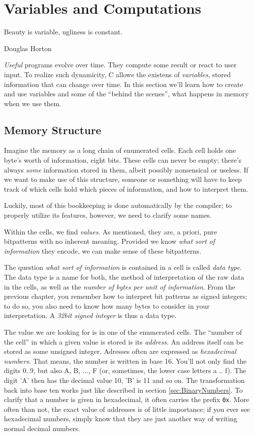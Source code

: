 \chapter{Variables and Computations}\label{chp:expressions}
\epigraph{Beauty is variable, ugliness is constant.}{Douglas Horton}

\emph{Useful} programs evolve over time. They compute some result or react to user input. To realize such dynamicity, C allows the existens of \emph{variables}, \ie stored information that can change over time. In this section we'll learn how to create and use variables and some of the \enquote{behind the scenes}, \ie what happens in memory when we use them.


\section{Memory Structure}
Imagine the memory as a long chain of enumerated cells. Each cell holds one byte's worth of information, \ie eight bits. These cells can never be empty; there's always \emph{some} information stored in them, albeit possibly nonsensical or useless. If we want to make use of this structure, someone or something will have to keep track of which cells hold which pieces of information, and how to interpret them.

Luckily, most of this bookkeeping is done automatically by the compiler; to properly utilize its features, however, we need to clarify some names.

Within the cells, we find \emph{values}. As mentioned, they are, a priori, pure bitpatterns with no inherent meaning. Provided we know \emph{what sort of information} they encode, we can make sense of these bitpatterns.

The question \emph{what sort of information} is contained in a cell is called \emph{data type}. The data type is a name for both, the method of interpretation of the raw data in the cells, as well as the \emph{number of bytes per unit of information}. From the previous chapter, you remember how to interpret bit patterns as signed integers; to do so, you also need to know how many bytes to consider in your interpretation. A \emph{32bit signed integer} is thus a data type.

The value we are looking for is in one of the enumerated cells. The \enquote{number of the cell} in which a given value is stored is its \emph{address}. An address itself can be stored as some unsigned integer. Adresses often are expressed as \emph{hexadecimal numbers}. That means, the number is written in base 16. You'll not only find the digits 0..9, but also A, B, ..., F (or, sometimes, the lower case letters a .. f). The digit 'A' then has the decimal value 10, 'B' is 11 and so on. The transformation back into base ten works just like described in section \ref{sec:BinaryNumbers}. To clarify that a number is given in hexadecimal, it often carries the prefix \texttt{0x}. More often than not, the exact value of addresses is of little importance; if you ever see hexadecimal numbers, simply know that they are just another way of writing normal decimal numbers.

